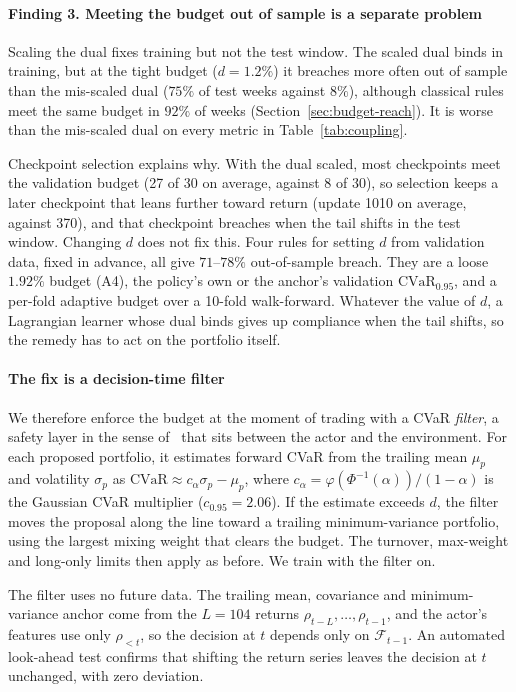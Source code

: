 \documentclass[sigconf]{acmart}
\begin{document}
\paragraph{Finding 3. Meeting the budget out of sample is a separate problem} Scaling the
dual fixes training but not the test window. The scaled dual binds in training, but at the tight
budget ($d=1.2\%$) it breaches more often out of sample than the mis-scaled dual ($75\%$ of test
weeks against $8\%$), although classical rules meet the same budget in $92\%$ of weeks
(Section~\ref{sec:budget-reach}). It is worse than the mis-scaled dual on every metric in
Table~\ref{tab:coupling}.

Checkpoint selection explains why. With the dual scaled, most checkpoints meet the validation
budget (27 of 30 on average, against 8 of 30), so selection keeps a later checkpoint that leans
further toward return (update 1010 on average, against 370), and that checkpoint breaches when
the tail shifts in the test window. Changing $d$ does not fix this. Four rules for setting $d$
from validation data, fixed in advance, all give $71$--$78\%$ out-of-sample breach. They are a loose $1.92\%$ budget (A4), the policy's own or the anchor's validation $\mathrm{CVaR}_{0.95}$, and a
per-fold adaptive budget over a 10-fold walk-forward. Whatever the value of $d$, a Lagrangian
learner whose dual binds gives up compliance when the tail shifts, so the remedy has to act on
the portfolio itself.

\paragraph{The fix is a decision-time filter} We therefore enforce the budget at the moment of
trading with a CVaR \emph{filter}, a safety layer in the sense of~\citet{dalal2018safe} that sits
between the actor and the environment. For each proposed portfolio, it estimates forward CVaR
from the trailing mean $\mu_p$ and volatility $\sigma_p$ as $\mathrm{CVaR}\approx
c_\alpha\sigma_p-\mu_p$, where $c_\alpha=\varphi(\Phi^{-1}(\alpha))/(1-\alpha)$ is the Gaussian
CVaR multiplier ($c_{0.95}=2.06$). If the estimate exceeds $d$, the filter moves the proposal
along the line toward a trailing minimum-variance portfolio, using the largest mixing weight
that clears the budget. The turnover, max-weight and long-only limits then apply as before. We
train with the filter on.

The filter uses no future data. The trailing mean, covariance and minimum-variance anchor come
from the $L=104$ returns $\rho_{t-L},\dots,\rho_{t-1}$, and the actor's features use only
$\rho_{<t}$, so the decision at $t$ depends only on $\mathcal{F}_{t-1}$. An automated look-ahead
test confirms that shifting the return series leaves the decision at $t$ unchanged, with zero
deviation.
\end{document}
